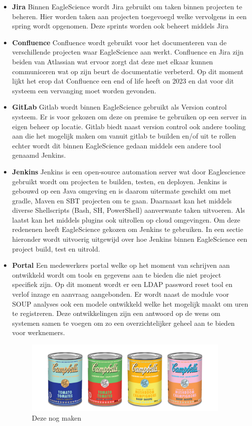 \begin{itemize}
    \item \textbf{Jira} Binnen EagleScience wordt Jira gebruikt om taken binnen projecten te beheren. Hier worden taken aan projecten toegevoegd welke vervolgens in een spring wordt opgenomen. Deze sprints worden ook beheert middels Jira
    \item \textbf{Confluence}
    Confluence wordt gebruikt voor het documenteren van de verschillende projecten waar EagleScience aan werkt. Confluence en Jira zijn beiden van Atlassian wat ervoor zorgt dat deze met elkaar kunnen communiceren wat op zijn beurt de documentatie verbeterd. Op dit moment lijkt het erop dat Confluence een end of life heeft on 2023 en dat voor dit systeem een vervanging moet worden gevonden.
    \item \textbf{GitLab}
    Gitlab wordt binnen EagleScience gebruikt als Version control systeem. Er is voor gekozen om deze on premise te gebruiken op een server in eigen beheer op locatie. Gitlab biedt naast version control ook andere tooling aan die het mogelijk maken om vanuit gitlab te builden en/of uit te rollen echter wordt dit binnen EagleScience gedaan middels een andere tool genaamd Jenkins.
    \item \textbf{Jenkins}
    Jenkins is een open-source automation server wat door Eaglescience gebruikt wordt om projecten te builden, testen, en deployen. Jenkins is gebouwd op een Java omgeving en is daarom uitermate geschikt om met gradle, Maven en SBT projecten om te gaan. Daarnaast kan het middels diverse Shellscripts (Bash, SH, PowerShell) aanverwante taken uitvoeren. Als laatst kan het middels plugins ook uitrollen op cloud omgevingen. Om deze redenenen heeft EagleScience gekozen om Jenkins te gebruiken. In een sectie hieronder wordt uitvoerig uitgewijd over hoe Jenkins binnen EagleScience een project build, test en uitrold.
    \item \textbf{Portal} Een medewerkers portal welke op het moment van schrijven aan ontwikkeld wordt om tools en gegevens aan te bieden die niet project specifiek zijn. Op dit moment wordt er een LDAP password reset tool en verlof inzage en aanvraag aangebonden. Er wordt naast de module voor SOUP analyses ook een modele ontwikkeld welke het mogelijk maakt om uren te registreren. Deze ontwikkelingen zijn een antwoord op de wens om systemen samen te voegen om zo een overzichtelijker geheel aan te bieden voor werknemers.

    \begin{figure}
        \centering
        \includegraphics[width=10cm]{gfx/soupcans}
        \caption{Deze nog maken}
        \label{fig:es-tooling}
    \end{figure}

\end{itemize}
